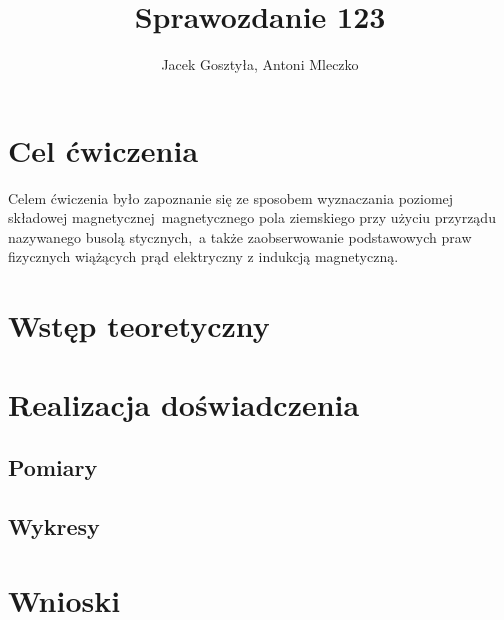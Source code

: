 \documentclass[11pt]{article}
\begin{document}
\title{Sprawozdanie 123}
\author{Jacek Gosztyła, Antoni Mleczko}
\maketitle
\section{Cel ćwiczenia} 
Celem ćwiczenia było zapoznanie się ze sposobem wyznaczania poziomej składowej magnetycznej\
magnetycznego pola ziemskiego przy użyciu przyrządu nazywanego busolą stycznych,\
a także zaobserwowanie podstawowych praw fizycznych wiążących prąd elektryczny z indukcją magnetyczną.
\section{Wstęp teoretyczny}

\section{Realizacja doświadczenia}
\subsection{Pomiary}
\subsection{Wykresy}
\section{Wnioski}
\end{document}
